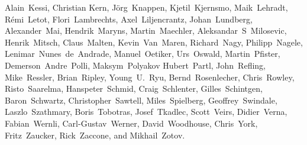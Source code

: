 {Alain~Kessi,            %
Christian Kern,         %
J\"org~Knappen,         %
Kjetil~Kjernsmo,        %
Maik~Lehradt,           %
R\'emi~Letot,           %
Flori~Lambrechts,       %
Axel~Liljencrantz,	%
Johan~Lundberg,         %
Alexander~Mai,          %
Hendrik~Maryns,         %
Martin~Maechler,        %
Aleksandar~S~Milosevic, %
Henrik~Mitsch,          %
Claus~Malten,           %
Kevin~Van~Maren,        %
Richard~Nagy,           %
Philipp~Nagele,         %
Lenimar~Nunes~de~Andrade, %
Manuel~Oetiker,         %
Urs~Oswald,             %
Martin~Pfister,		%
Demerson~Andre~Polli,   %
Maksym~Polyakov         %
Hubert~Partl,           %
John~Refling,           %
Mike~Ressler,           %
Brian~Ripley,           %
Young~U.~Ryu,           %
Bernd~Rosenlecher,      %
Chris~Rowley,           %
Risto~Saarelma,         %
Hanspeter~Schmid,       %
Craig~Schlenter,        %
Gilles~Schintgen,       %
Baron~Schwartz,         %
Christopher~Sawtell,    %
Miles~Spielberg,        %
Geoffrey~Swindale,      %
Laszlo~Szathmary,       %
Boris~Tobotras,         %
Josef~Tkadlec,          %
Scott~Veirs,            %
Didier~Verna,           %
Fabian~Wernli,          %
Carl-Gustav~Werner,     %
David~Woodhouse,        %
Chris~York,             %
Fritz~Zaucker,          %
Rick~Zaccone,           %
and Mikhail~Zotov.      %

}




\pagebreak
\endinput
%

